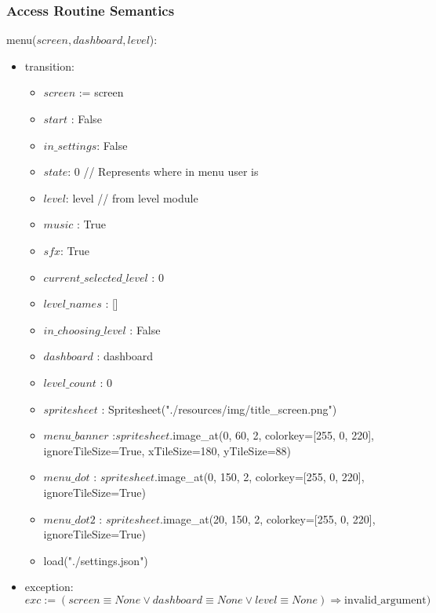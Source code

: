 \documentclass[12pt]{article}
\begin{document}
\subsubsection {Access Routine Semantics}

\noindent menu($\mathit{screen, dashboard, level}$):
\begin{itemize}
\item transition:
\begin{itemize}
    \item $screen$ := screen
    \item $start$ : False
    \item $in\_settings$: False
    \item $state$: 0 // Represents where in menu user is
    \item $level$: level // from level module
    \item $music$ : True
    \item $sfx$: True
    \item $current\_selected\_level$ : 0
    \item $level\_names$ : []
    \item $in\_choosing\_level$ : False
    \item $dashboard$ : dashboard
    \item $level\_count$ : 0
    \item $spritesheet$ : Spritesheet("./resources/img/title\_screen.png")
    \item $menu\_banner$ :$spritesheet$.image\_at(0, 60, 2, colorkey=[255, 0, 220], ignoreTileSize=True, xTileSize=180, yTileSize=88)
    \item $menu\_dot$ : $spritesheet$.image\_at(0, 150, 2, colorkey=[255, 0, 220], ignoreTileSize=True)
    \item $menu\_dot2$ : $spritesheet$.image\_at(20, 150, 2, colorkey=[255, 0, 220], ignoreTileSize=True)
    \item load\settings("./settings.json")
\end{itemize}
\item exception: $exc := (screen \equiv None \lor dashboard \equiv None \lor level \equiv None) \Rightarrow \text{invalid\_argument})$
\end{itemize}
\end{document}
